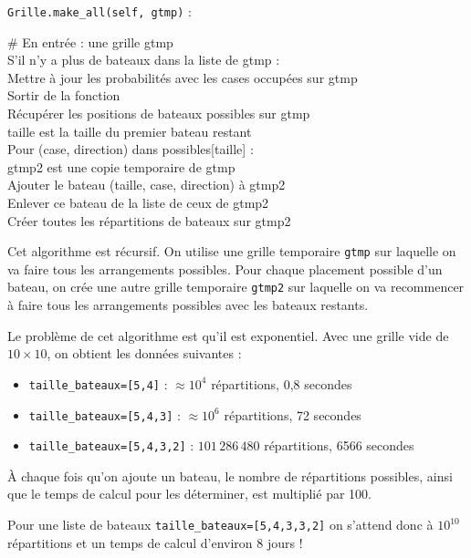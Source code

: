 \texttt{Grille.make\_all(self, gtmp)} :
\begin{algo1}
\# En entrée : une grille gtmp\\
S'il n'y a plus de bateaux dans la liste de gtmp :\\
Mettre à jour les probabilités avec les cases occupées sur gtmp\\
Sortir de la fonction\\
Récupérer les positions de bateaux possibles sur gtmp\\
taille est la taille du premier bateau restant\\
Pour (case, direction) dans possibles[taille] :\\
gtmp2 est une copie temporaire de gtmp\\
Ajouter le bateau (taille, case, direction) à gtmp2\\
Enlever ce bateau de la liste de ceux de gtmp2\\
Créer toutes les répartitions de bateaux sur gtmp2\\
\end{algo1}

Cet algorithme est récursif. On utilise une grille temporaire \texttt{gtmp} sur laquelle on va faire tous les arrangements possibles. Pour chaque placement possible d'un bateau, on crée une autre grille temporaire \texttt{gtmp2} sur laquelle on va recommencer à faire tous les arrangements possibles avec les bateaux restants.

\medskip

Le problème de cet algorithme est qu'il est exponentiel. Avec une grille vide de $10\times 10$, on obtient les données suivantes :
\begin{itemize}
\item \texttt{taille\_bateaux=[5,4]} : $\approx 10^4$ répartitions, 0,8 secondes
\item \texttt{taille\_bateaux=[5,4,3]} : $\approx 10^6$ répartitions, 72 secondes
\item \texttt{taille\_bateaux=[5,4,3,2]} : $101\,286\,480$ répartitions, 6566 secondes
\end{itemize}

À chaque fois qu'on ajoute un bateau, le nombre de répartitions possibles, ainsi que le temps de calcul pour les déterminer, est multiplié par 100.

Pour une liste de bateaux \texttt{taille\_bateaux=[5,4,3,3,2]} on s'attend donc à $10^{10}$ répartitions et un temps de calcul d'environ 8 jours !

